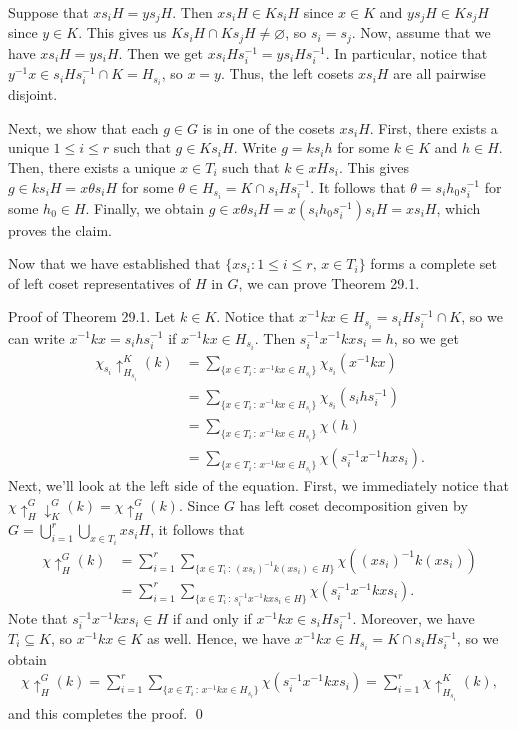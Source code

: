 Suppose that $xs_iH = ys_jH$. Then $xs_iH \in Ks_iH$ since $x \in K$ and 
$ys_jH \in Ks_jH$ since $y \in K$. This gives us $Ks_iH \cap Ks_jH \neq 
\varnothing$, so $s_i = s_j$. Now, assume that we have $xs_iH = ys_iH$. 
Then we get $xs_iHs_i^{-1} = ys_iHs_i^{-1}$. In particular, notice that 
$y^{-1}x \in s_iHs_i^{-1} \cap K = H_{s_i}$, so $x = y$. Thus, the left cosets 
$xs_iH$ are all pairwise disjoint. 

Next, we show that each $g \in G$ is in one of the cosets $xs_iH$. 
First, there exists a unique $1 \leq i \leq r$ such that $g \in Ks_iH$. 
Write $g = ks_ih$ for some $k \in K$ and $h \in H$. Then, there exists a 
unique $x \in T_i$ such that $k \in xHs_i$. This gives $g \in ks_iH = 
x\theta s_iH$ for some $\theta \in H_{s_i} = K \cap s_iHs_i^{-1}$. 
It follows that $\theta = s_ih_0s_i^{-1}$ for some $h_0 \in H$. Finally, 
we obtain $g \in x\theta s_iH = x(s_ih_0s_i^{-1})s_i H = xs_i H$,
which proves the claim. 

Now that we have established that $\{xs_i : 1 \leq i \leq r,\,x\in T_i\}$ 
forms a complete set of left coset representatives of $H$ in $G$, 
we can prove Theorem 29.1. 

{\sc Proof of Theorem 29.1.} Let $k \in K$. Notice that 
$x^{-1}kx \in H_{s_i} = s_iHs_i^{-1} \cap K$, so we can write 
$x^{-1}kx = s_ihs_i^{-1}$ if $x^{-1}kx \in H_{s_i}$. Then $s_i^{-1}x^{-1}kxs_i 
= h$, so we get 
\begin{align*}
    \chi_{s_i} \uparrow_{H_{s_i}}^K (k) 
    &= \sum_{\{x\in T_i\,:\,x^{-1}kx\in H_{s_i}\}} \chi_{s_i}(x^{-1}kx) \\
    &= \sum_{\{x\in T_i\,:\,x^{-1}kx\in H_{s_i}\}} \chi_{s_i}(s_ihs_i^{-1}) \\  
    &= \sum_{\{x\in T_i\,:\,x^{-1}kx\in H_{s_i}\}} \chi(h) \\ 
    &= \sum_{\{x\in T_i\,:\,x^{-1}kx\in H_{s_i}\}} \chi(s_i^{-1}x^{-1}hxs_i).
\end{align*}
Next, we'll look at the left side of the equation. First, we immediately 
notice that $\chi \uparrow_H^G \downarrow_K^G (k) = \chi \uparrow_H^G (k)$. 
Since $G$ has left coset decomposition given by $G = \bigcup_{i=1}^r 
\bigcup_{x\in T_i} xs_i H$, it follows that 
\begin{align*}
    \chi \uparrow_H^G (k) 
    &= \sum_{i=1}^r \sum_{\{x\in T_i\,:\,(xs_i)^{-1}k(xs_i) \in H\}} \chi((xs_i)^{-1}k(xs_i)) \\
    &= \sum_{i=1}^r \sum_{\{x\in T_i\,:\,s_i^{-1}x^{-1}kxs_i \in H\}} \chi(s_i^{-1}x^{-1}kxs_i). 
\end{align*} 
Note that $s_i^{-1}x^{-1}kxs_i \in H$ if and only if $x^{-1}kx \in s_iHs_i^{-1}$. 
Moreover, we have $T_i \subseteq K$, so $x^{-1}kx \in K$ as well. 
Hence, we have $x^{-1}kx \in H_{s_i} = K \cap s_iHs_i^{-1}$, so we obtain 
\begin{align*}
    \chi \uparrow_H^G (k) 
    = \sum_{i=1}^r \sum_{\{x\in T_i\,:\,x^{-1}kx \in H_{s_i}\}} \chi(s_i^{-1}x^{-1}kxs_i) 
    = \sum_{i=1}^r \chi \uparrow_{H_{s_i}}^K (k),
\end{align*}
and this completes the proof. \qed

